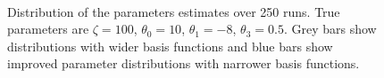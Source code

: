 \documentclass[12pt]{iopart}
\begin{document}
\begin{figure}[th]
\\
\caption{Distribution of the parameters estimates over 250
runs. True parameters are $\zeta=100$, $\theta_0 = 10$, $\theta_1 = -8$, $\theta_3 = 0.5$. Grey bars show distributions with wider basis functions and blue bars show improved parameter distributions with narrower basis functions.}
\label{fig:Parameters}
\end{figure}
\end{document}
